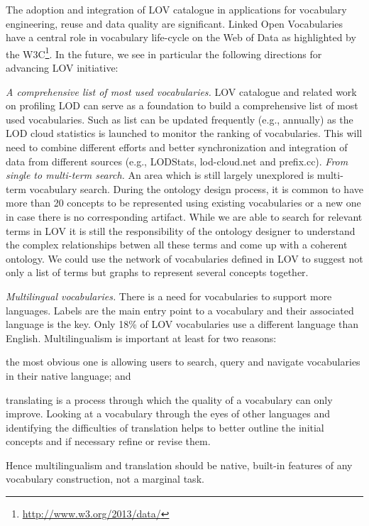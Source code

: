 \documentclass{iosart2c}
\begin{document}
The adoption and integration of LOV catalogue in applications for vocabulary engineering, reuse and data quality are significant. Linked Open Vocabularies have a central role in vocabulary life-cycle on the Web of Data as highlighted by the W3C\footnote{\url{http://www.w3.org/2013/data/}}. In the future, we see in particular the following directions for advancing LOV initiative:

\emph{A comprehensive list of most used vocabularies.} LOV catalogue and related work on profiling 
LOD can serve as a foundation to build a comprehensive list of most used vocabularies. Such as list
can be updated frequently (e.g., annually) as the LOD cloud statistics is launched to monitor the ranking 
of vocabularies. This will need to combine different efforts and better synchronization and integration of data from different sources (e.g., LODStats, lod-cloud.net and prefix.cc).
\emph{From single to multi-term search.} An area which is still largely unexplored is multi-term vocabulary search. During the ontology design process, it is common to have more than 20 concepts to be represented using existing vocabularies or a new one in case there is no corresponding artifact. While we are able to search for relevant terms in LOV it is still the responsibility of the ontology designer to understand the complex relationships betwen all these terms and come up with a coherent ontology. We could use the network of vocabularies defined in LOV to suggest not only a list of terms but graphs to represent several concepts together.

\emph{Multilingual vocabularies.} There is a need for vocabularies to support more languages. Labels are the main entry point to a vocabulary and their associated language is the key. Only 18\% of LOV vocabularies use a different language than English. Multilingualism is important at least for two reasons: 
\begin{inparaenum}[1)] 
	\item the most obvious one is allowing users to search, query and navigate vocabularies in their native language; and
	\item translating is a process through which the quality of a vocabulary can only improve. Looking at a vocabulary through the eyes of other languages and identifying the difficulties of translation helps to better outline the initial concepts and if necessary refine or revise them. 
\end{inparaenum} 
Hence multilingualism and translation should be native, built-in features of any vocabulary construction, not a marginal task.
\end{document}
